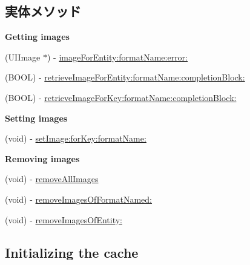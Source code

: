 \subsection*{実体メソッド}
\begin{Indent}{\bf Getting images}\par
{\em 

 

 }\begin{DoxyCompactItemize}
\item 
(U\+I\+Image $\ast$) -\/ \hyperlink{interface_h_n_k_cache_a0d0567e2654dae805279b55432226a35}{image\+For\+Entity\+:format\+Name\+:error\+:}
\item 
(B\+O\+O\+L) -\/ \hyperlink{interface_h_n_k_cache_a05ffc1b5bcc88ae33e9a914a17b2eaf0}{retrieve\+Image\+For\+Entity\+:format\+Name\+:completion\+Block\+:}
\item 
(B\+O\+O\+L) -\/ \hyperlink{interface_h_n_k_cache_a9b3f87e9d4189c0ec91b634b8f581296}{retrieve\+Image\+For\+Key\+:format\+Name\+:completion\+Block\+:}
\end{DoxyCompactItemize}
\end{Indent}
\begin{Indent}{\bf Setting images}\par
{\em 

 

 }\begin{DoxyCompactItemize}
\item 
(void) -\/ \hyperlink{interface_h_n_k_cache_acf8eec52df76d3baddbb5db9d14ea130}{set\+Image\+:for\+Key\+:format\+Name\+:}
\end{DoxyCompactItemize}
\end{Indent}
\begin{Indent}{\bf Removing images}\par
{\em 

 

 }\begin{DoxyCompactItemize}
\item 
(void) -\/ \hyperlink{interface_h_n_k_cache_a6a2363137e2e666f0c2b0b6b6f1b7878}{remove\+All\+Images}
\item 
(void) -\/ \hyperlink{interface_h_n_k_cache_a7cefa5aa5dc717a6e6c7a4e92dad22f1}{remove\+Images\+Of\+Format\+Named\+:}
\item 
(void) -\/ \hyperlink{interface_h_n_k_cache_a883d1792fdc2fb05da72afbef8fdd350}{remove\+Images\+Of\+Entity\+:}
\end{DoxyCompactItemize}
\end{Indent}
\subsection*{Initializing the cache}
\label{_amgrpb7f85940c1a734cf9695eec43d94a3d8}%


